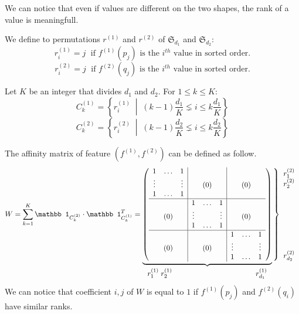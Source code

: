 \documentclass[a4paper]{article}
\begin{document}
  We can notice that even if values are different on the two shapes, the rank of a value is meaningfull. 
  
  \newpage
  
  We define to permutations $r^{(1)}$ and $r^{(2)}$ of $\mathfrak S_{d_1}$ and $\mathfrak S_{d_2}$:
  \[r^{(1)}_i = j \;\text{ if }f^{(1)}(p_j)\text{ is the }i^{th}\text{ value in sorted order.}\]
  \[r^{(2)}_i = j \;\text{ if }f^{(2)}(q_j)\text{ is the }i^{th}\text{ value in sorted order.}\]
  
  \medskip Let $K$ be an integer that divides $d_1$ and $d_2$. For $1 \leq k \leq K$:
  \[C_k^{(1)} = \left\{r^{(1)}_i \;\middle|\; (k-1)\frac{d_1}{K} \lneq i \leq k\frac{d_1}{K} \right\}\]
  \[C_k^{(2)} = \left\{r^{(2)}_i \;\middle|\; (k-1)\frac{d_2}{K} \lneq i \leq k\frac{d_2}{K} \right\}\]

The affinity matrix of feature $(f^{(1)}, f^{(2)})$ can be defined as follow.
\[W = \sum_{k=1}^K \mathbb 1_{C^{(2)}_k} \cdot \mathbb 1_{C^{(1)}_k}^T = \underbrace{\left(\begin{array}{ccc|ccc|ccc}
1 & \dots & 1 & && & && \\
\vdots & & \vdots & &(0)& & &(0)& \\
1 & \dots & 1 & && & && \\\hline
&& & 1 & \dots & 1 & &&\\
&(0)& & \vdots & & \vdots & &(0)&\\
&& & 1 & \dots & 1 & &&\\\hline
&& & && & 1 & \dots & 1\\
&(0)& & &(0)& & \vdots && \vdots\\
&& & && & 1 & \dots & 1\\
\end{array}\right)}_{\displaystyle r^{(1)}_1 \; r^{(1)}_2 \hspace{4cm} r^{(1)}_{d_1}}\left\}\begin{array}{c}r^{(2)}_1\\r^{(2)}_2\\\\\\\\\\\\\\\\r^{(2)}_{d_2}\end{array}\right.\]
We can notice that coefficient $i,j$ of $W$ is equal to $1$ if $f^{(1)}(p_j)$ and $f^{(2)}(q_i)$ have similar ranks.
\end{document}
